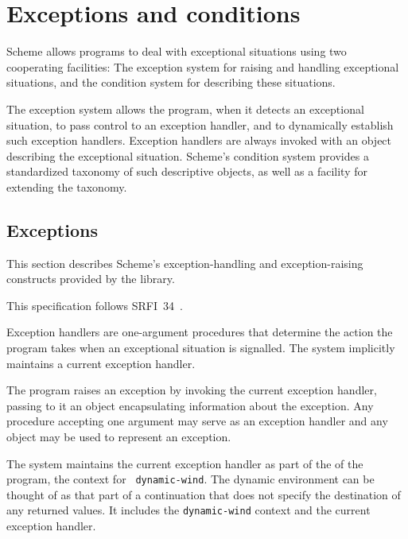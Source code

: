 \chapter{Exceptions and conditions}
\label{exceptionsconditionschapter}

Scheme allows programs to deal with exceptional situations using two
cooperating facilities: The exception system for raising and handling
exceptional situations, and the condition system for describing these
situations.

The exception system allows the program, when it detects an
exceptional situation, to pass control to an exception handler, and
to dynamically establish such exception handlers.  Exception
handlers are always invoked with an object describing the exceptional
situation.  Scheme's condition system provides a standardized taxonomy
of such descriptive objects, as well as a facility for extending the
taxonomy.

\section{Exceptions}
\label{exceptionssection}

This section describes Scheme's exception-handling and
exception-raising constructs provided by the  library.

\begin{note}
  This specification follows SRFI~34~\cite{srfi34}.
\end{note}

Exception handlers are one-argument procedures that determine the
action the program takes when an exceptional situation is signalled.
The system implicitly maintains a current exception handler.

The program raises an exception
by invoking the current exception handler, passing to it an object
encapsulating information about the exception. Any procedure accepting
one argument may serve as an exception handler and any object may be
used to represent an exception.

The system maintains the current exception handler as part of the
 of the program, the context for {\tt
  dynamic-wind}. The dynamic environment can be thought of as that
part of a continuation that does not specify the destination of any
returned values. It includes the {\tt dynamic-wind} context and the
current exception handler.

